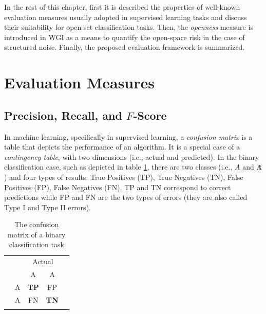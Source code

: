 In the rest of this chapter, first it is described the properties of well-known evaluation measures usually adopted in supervised learning tasks and discuss their suitability for open-set classification tasks. Then, the \emph{openness} measure is introduced in WGI as a means to quantify the open-space risk in the case of structured noise. Finally, the proposed evaluation framework is summarized.

\section{Evaluation Measures}
\label{chap:eval_methods:sec:measures} 

\subsection{Precision, Recall, and $F$-Score}
\label{chap:eval_methods:sec:prf_micro}

In machine learning, specifically in supervised learning, a \textit{confusion matrix} is a table that depicts the performance of an algorithm. It is a special case of a \textit{contingency table}, with two dimensions (i.e., actual and predicted). In the binary classification case, such as depicted in table \ref{chap:eval_methods:tbl:bin_confusion}, there are two classes (i.e., $A$ and $\not A$ ) and four types of results: True Positives (TP), True Negatives (TN), False Positives (FP), False Negatives (FN). TP and TN correspond to correct predictions while FP and FN are the two types of errors (they are also called Type I and Type II errors).

\begin{table}[t]
	\center
	\caption{The confusion matrix of a binary classification task}\label{chap:eval_methods:tbl:bin_confusion}
	\begin{tabular}{c c c c c}
		& & \multicolumn{2}{c}{Actual} & \\
		\cline{3-4}
		\multirow{3}{*}{\rotatebox[origin=r]{90}{Predicted}} & & \multicolumn{1}{|c}{A} & \multicolumn{1}{c|}{\neg A} &  \\
		\cline{2-4}
		& \multicolumn{1}{|c}{A} & \multicolumn{1}{|c}{\textbf{TP}} & \multicolumn{1}{c|}{FP} & \\
		& \multicolumn{1}{|c}{\neg A} & \multicolumn{1}{|c}{FN} &  \multicolumn{1}{c|}{\textbf{TN}} \\
		\cline{2-4}
		\\
	\end{tabular}
\end{table}

